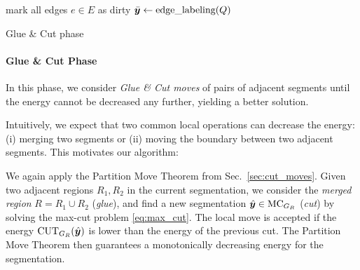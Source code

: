 \begin{algorithm}[t]
\ifx\DontPrintSemicolon\undefined
\else
\DontPrintSemicolon
\fi
{}
%
mark all edges $e\in E$ as dirty\;
$\bar{\boldsymbol y} \leftarrow \text{edge\_labeling}(Q)$\;
%
\caption{Glue \& Cut phase\label{alg:glue_cut_phase}}
\end{algorithm}
%

\paragraph{Glue \& Cut Phase}
In this phase, we consider \emph{Glue \& Cut moves}
of pairs of adjacent segments until the energy cannot be decreased any further,
yielding a better solution.

Intuitively, we expect that two common local operations can decrease the
energy: (i) merging two segments or (ii) moving the boundary between
two adjacent segments. This motivates our algorithm:

We again apply the Partition Move Theorem from Sec.~\ref{sec:cut_moves}.
Given two adjacent regions $R_1, R_2$ in the current segmentation,
we consider the \emph{merged region} $R = R_1 \cup R_2$ (\emph{glue}),
and find a new segmentation $\hat{\boldsymbol y}\in\text{MC}_{G_R}$ (\emph{cut})
by solving the max-cut problem \eqref{eq:max_cut}.
The local move is accepted if the energy $\text{CUT}_{G_R}(\hat{\boldsymbol y})$
is lower than the energy of the previous cut.
The Partition Move Theorem then guarantees a
monotonically decreasing energy for the segmentation.

